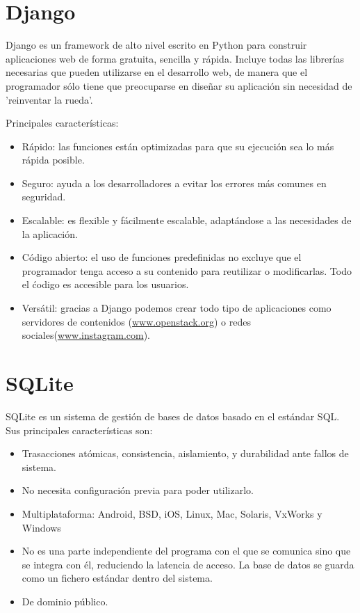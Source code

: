 \documentclass[a4paper, 12pt]{book}
\begin{document}
\section{Django} 
\label{sec:seccion3}
Django es un framework de alto nivel escrito en Python para construir aplicaciones web de forma gratuita, sencilla y rápida. Incluye todas las librerías necesarias que pueden utilizarse en el desarrollo web, de manera que el programador sólo tiene que preocuparse en diseñar su aplicación sin necesidad de 'reinventar la rueda'.

Principales características:
\begin{itemize}
	\item Rápido: las funciones están optimizadas para que su ejecución sea lo más rápida posible.
	\item Seguro: ayuda a los desarrolladores a evitar los errores más comunes en seguridad.  
	\item Escalable: es flexible y fácilmente escalable, adaptándose a las necesidades de la aplicación. 
	\item Código abierto: el uso de funciones predefinidas no excluye que el programador tenga acceso a su contenido para reutilizar o modificarlas. Todo el ćodigo es accesible para los usuarios. 
	\item Versátil: gracias a Django podemos crear todo tipo de aplicaciones como servidores de contenidos (\url{www.openstack.org}) o redes sociales(\url{www.instagram.com}).
\end{itemize}
\section{SQLite} 
\label{sec:seccion4}
SQLite es un sistema de gestión de bases de datos basado en el estándar SQL. Sus principales características son:
\begin{itemize}
	\item Trasacciones atómicas, consistencia, aislamiento, y durabilidad ante fallos de sistema. 
	\item No necesita configuración previa para poder utilizarlo.
	\item Multiplataforma: Android, BSD, iOS, Linux, Mac, Solaris, VxWorks y Windows
	\item No es una parte independiente del programa con el que se comunica sino que se integra con él, reduciendo la latencia de acceso. La base de datos se guarda como un fichero estándar dentro del sistema. 
	\item De dominio público. 
\end{itemize}
\end{document}
